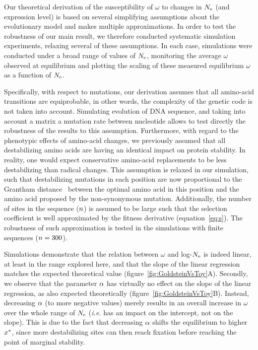 Our theoretical derivation of the susceptibility of $\omega$ to changes in $N_{\mathrm{e}}$ (and expression level) is based on several simplifying assumptions about the evolutionary model and makes multiple approximations.
In order to test the robustness of our main result, we therefore conducted systematic simulation experiments, relaxing several of these assumptions.
In each case, simulations were conducted under a broad range of values of $N_{\mathrm{e}}$, monitoring the average $\omega$ observed at equilibrium and plotting the scaling of these measured equilibrium $\omega$ as a function of $N_{\mathrm{e}}$.

Specifically, with respect to mutations, our derivation assumes that all amino-acid transitions are equiprobable, in other words, the complexity of the genetic code is not taken into account.
Simulating evolution of \acrshort{DNA} sequence, and taking into account a matrix a mutation rate between nucleotide allows to test directly the robustness of the results to this assumption.
Furthermore, with regard to the phenotypic effects of amino-acid changes, we previously assumed that all destabilizing amino acids are having an identical impact on protein stability.
In reality, one would expect conservative amino-acid replacements to be less destabilizing than radical changes.
This assumption is relaxed in our simulation, such that destabilizing mutations in each position are now proportional to the Grantham distance~\citep{Grantham1974} between the optimal amino acid in this position and the amino acid proposed by the non-synonymous mutation.
Additionally, the number of sites in the sequence ($n$) is assumed to be large such that the selection coefficient is well approximated by the fitness derivative (equation~\ref{eq:s}).
The robustness of such approximation is tested in the simulations with finite sequences ($n=300$).

Simulations demonstrate that the relation between $\omega$ and log-$N_{\mathrm{e}}$ is indeed linear, at least in the range explored here, and that the slope of the linear regression matches the expected theoretical value (figure~\ref{fig:GoldsteinVsToy}A).
Secondly, we observe that the parameter $\alpha$ has virtually no effect on the slope of the linear regression, as also expected theoretically (figure~\ref{fig:GoldsteinVsToy}B).
Instead, decreasing $\alpha$ (to more negative values) merely results in an overall increase in $\omega$ over the whole range of $N_{\mathrm{e}}$ (\textit{i.e.} has an impact on the intercept, not on the slope).
This is due to the fact that decreasing $\alpha$ shifts the equilibrium to higher $x^{*}$, since more destabilizing sites can then reach fixation before reaching the point of marginal stability.

